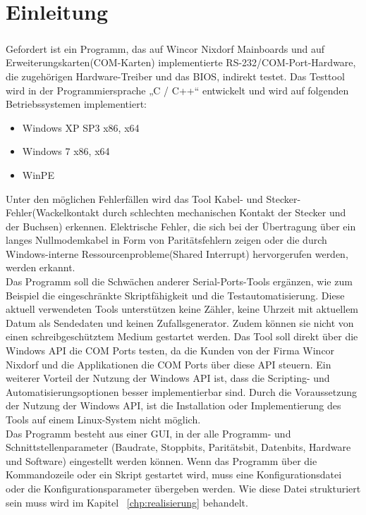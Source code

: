 \chapter{Einleitung}\label{chp:einleitung}
\paragraph{}
Gefordert ist ein Programm, das auf Wincor Nixdorf Mainboards und auf Erweiterungskarten(COM-Karten) implementierte RS-232/COM-Port-Hardware, die zugehörigen Hardware-Treiber und das BIOS, indirekt testet. Das Testtool wird in der Programmiersprache „C / C++“ entwickelt und wird auf folgenden Betriebssystemen implementiert:

\begin{itemize}
\item Windows XP SP3 x86, x64
\item Windows 7 x86, x64
\item  WinPE
\end{itemize}

Unter den möglichen Fehlerfällen wird das Tool Kabel- und Stecker-Fehler(Wackelkontakt durch schlechten mechanischen Kontakt der Stecker und der Buchsen) erkennen.
Elektrische Fehler, die sich bei der Übertragung über ein langes Nullmodemkabel in Form von Paritätsfehlern zeigen oder die durch Windows-interne Ressourcenprobleme(Shared Interrupt) hervorgerufen werden, werden erkannt.\\

Das Programm soll die Schwächen anderer Serial-Ports-Tools ergänzen, wie zum Beispiel die eingeschränkte Skriptfähigkeit und die Testautomatisierung. Diese aktuell verwendeten Tools unterstützen keine Zähler, keine Uhrzeit mit aktuellem Datum als Sendedaten und keinen Zufallsgenerator. Zudem können sie nicht von einen schreibgeschütztem Medium gestartet werden. Das Tool soll direkt über die Windows API die COM Ports testen, da die Kunden von der Firma Wincor Nixdorf und die Applikationen die COM Ports über diese API steuern. Ein weiterer Vorteil der Nutzung der Windows API ist, dass die Scripting- und Automatisierungsoptionen besser implementierbar sind. Durch die Voraussetzung der Nutzung der Windows API, ist die Installation oder Implementierung des Tools auf einem Linux-System nicht möglich.\\

Das Programm besteht aus einer GUI, in der alle Programm- und Schnittstellenparameter (Baudrate, Stoppbits, Paritätsbit, Datenbits, Hardware und Software) eingestellt werden können. Wenn das Programm über die Kommandozeile oder ein Skript gestartet wird, muss eine Konfigurationsdatei oder die Konfigurationsparameter übergeben werden. Wie diese Datei strukturiert sein muss wird im Kapitel ~\ref{chp:realisierung} behandelt.